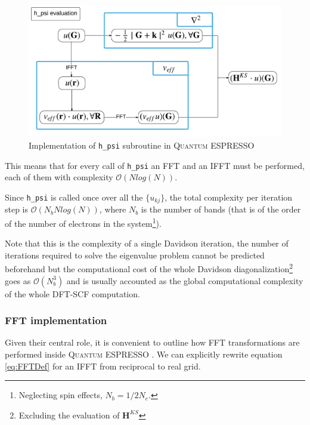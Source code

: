 \documentclass[a4paper,12pt]{article}
\newcommand\mf[1]{\mathbf{#1}}
\newcommand\QE{\textsc{Quantum} ESPRESSO }
\newcommand\bigO{\mathcal{O}}
\begin{document}
\begin{figure}[h]
\begin{center}
	\begin{framed}
	\includegraphics[width=\linewidth]{h_psi.pdf}

	\end{framed}
\caption{Implementation of \texttt{h\_psi} subroutine in \QE}
	\label{fig:hpsi}
\end{center}
\end{figure}


This means that for every call of \texttt{h\_psi} an FFT and an IFFT must be performed, each of them with complexity $\bigO(N log (N))$. 

Since \texttt{h\_psi} is called once over all the $\{u_{kj}\}$, the total complexity per iteration step is $\bigO(N_{b} N log (N))$, where $N_{b}$ is the number of bands (that is of the order of the number of electrons in the system\footnote{Neglecting spin effects, $N_b = 1/2 N_e$.}). 

Note that this is the complexity of a single Davidson iteration, the number of iterations required to solve the eigenvalue problem cannot be predicted beforehand but the computational cost of the whole Davidson diagonalization\footnote{Excluding the evaluation of $\mf{H}^{KS}$} goes as $\bigO(N_{b}^3)$ and is usually accounted as the global computational complexity of the whole DFT-SCF computation.

\subsubsection{FFT implementation}
Given their central role, it is convenient to outline how FFT transformations are performed inside \QE .
We can explicitly rewrite equation \eqref{eq:FFTDef} for an IFFT from reciprocal to real grid.
\end{document}
